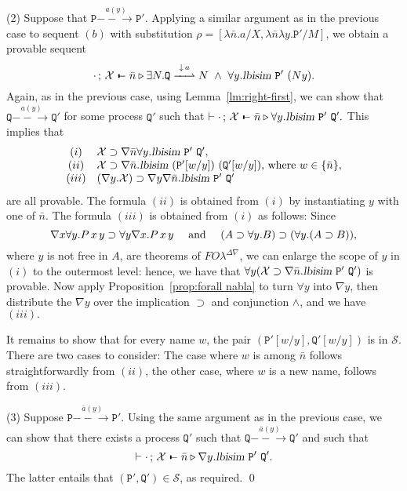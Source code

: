 \documentclass{acmtrans2m}
\def\Sscr{{\mathcal S}}
\def\Xscr{{\mathcal X}}
\def\Ppi{{\mathtt P}}
\def\Qpi{{\mathtt Q}}
\def\relbar{\mathrel{\smash-}}
\def\joinrelm{\mathrel{\mkern-3.2mu}}
\def\tailpiece{\kern 1pt\vrule height 1ex width 0.3ex depth -.25ex}
\def\seqsym{\mathrel{\tailpiece\joinrelm\relbar}}
\newcommand{\FOL   }{FO\lambda}
\newcommand{\FOLDNb}{\FOL^{\Delta\nabla}}
\newcommand{\Judg}[2]{#1\triangleright#2}
\newcommand{\NSeq}[3]{#1\,;\,#2 \seqsym #3}
\newcommand{\lbisim}[2]{\hbox{\sl lbisim}~#1~#2}
\newcommand{\inact}{\mathop{\downarrow}}
\newcommand{\oimp}{\supset}
\newcommand{\one  }[3]{#1\stackrel{#2}{-\!\!-\!\!\!\rightarrow    } #3}
\newcommand{\onep }[3]{#1\stackrel{#2}{-\!\!-\!\!\!\rightharpoonup} #3}
\begin{document}
\noindent(2) Suppose that $\one{\Ppi}{a(y)}{\Ppi'}.$
Applying a similar argument as in the previous case to sequent $(b)$ with
substitution $\rho = [\lambda \bar n.a/X, \lambda \bar n\lambda y.\Ppi'/M]$,
we obtain a provable sequent 
$$
\NSeq{\cdot}{\Xscr}{\Judg{\bar{n}}{\exists N.
                    \onep{\Qpi}{\inact a}{N}~\land~
                    \forall y. \lbisim{\Ppi'}{(Ny)}}}.
$$
Again, as in the previous case, using Lemma~\ref{lm:right-first}, we can show that
$\one{\Qpi}{a(y)}{\Qpi'}$ for some process $\Qpi'$ such that
$
\vdash \NSeq{\cdot}{\Xscr}{\Judg{\bar n}{\forall y. \lbisim {\Ppi'} {\Qpi'}}}.
$
This implies that 
$$
\begin{array}{cl}
(i) & \Xscr \oimp \nabla \bar n \forall y. \lbisim {\Ppi'}{\Qpi'},\\
(ii) & \Xscr \oimp \nabla \bar n. \lbisim {(\Ppi'[w/y])}{(\Qpi'[w/y])} \hbox {, where $w \in \{\bar n\},$} \\
(iii) & (\nabla y. \Xscr) \oimp \nabla y\nabla \bar n. \lbisim {\Ppi'} {\Qpi'}
\end{array}
$$
are all provable.
The formula $(ii)$ is obtained from $(i)$ by instantiating $y$ with one of $\bar n.$
The formula $(iii)$ is obtained from $(i)$ as follows:
Since 
$$
\nabla x \forall y. P\,x\,y \oimp \forall y\nabla x.P\,x\,y
\quad
\hbox{ and }
\quad
(A \oimp \forall y.B) \oimp (\forall y.(A \oimp B)),
$$
where $y$ is not free in $A$, are theorems of $\FOLDNb$, 
we can enlarge the scope of $y$ in $(i)$ to the outermost level:
hence, we have that $\forall y(\Xscr \oimp \nabla \bar n.\lbisim {\Ppi'} {\Qpi'})$
is provable. Now apply Proposition~\ref{prop:forall nabla} to turn $\forall y$ into $\nabla y$, then distribute
the $\nabla y$ over the implication $\oimp$ and conjunction $\land$, and we have $(iii).$

It remains to show that for every name $w$, the pair
$(\Ppi'[w/y], \Qpi'[w/y])$ is in $\Sscr.$ There are two cases to consider:
The case where $w$ is among $\bar n$ follows straightforwardly from $(ii)$,
the other case, where $w$ is a new name, follows from $(iii).$

\noindent(3) Suppose $\one{\Ppi}{\bar a(y)}{\Ppi'}.$ Using the same argument as in the previous case,
we can show that there exists a process $\Qpi'$ such that $\one{\Qpi}{\bar a(y)}{\Qpi'}$
and such that
$$
\vdash \NSeq{\cdot}{\Xscr}{\Judg{\bar n}{\nabla y. \lbisim {\Ppi'} {\Qpi'}}}.
$$
The latter entails that $(\Ppi', \Qpi') \in \Sscr$, as required. \qed
\end{document}
